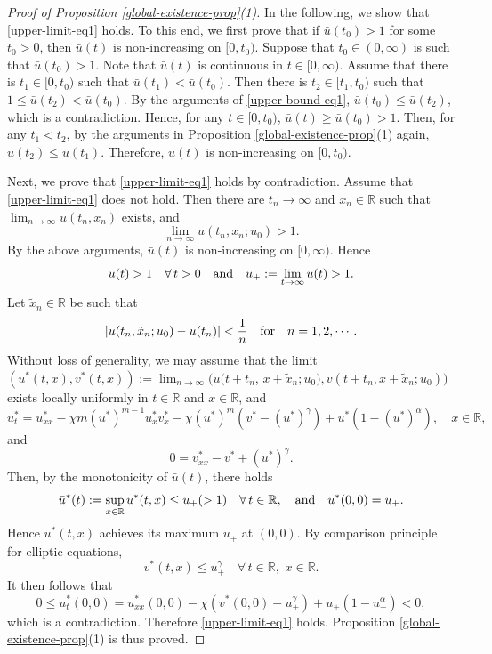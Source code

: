 \documentclass[11pt]{article} %
\theoremstyle{remark}
\theoremstyle{remark}
\numberwithin{equation}{section}
\numberwithin{figure}{section}
\numberwithin{table}{section}
\newcommand\RR{\ensuremath{\mathbb{R}}}
\begin{document}
\begin{proof} [Proof of Proposition \ref{global-existence-prop}(1)]
In the following, we show that \eqref{upper-limit-eq1} holds. 
To this end,  we first  prove that if $\bar u(t_0)>1$ for some $t_0>0$, then
$\bar u(t)$  is  non-increasing on $[0,t_0)$. 
Suppose that $t_0\in (0,\infty)$ is such that $\bar u(t_0)>1$.  Note that $\bar u(t)$ is continuous in $t\in [0,\infty)$.
Assume that there is $t_1\in [0,t_0)$ such that  $\bar u(t_1)<\bar u(t_0)$. Then there is $t_2\in [t_1,t_0)$ such that $1\le \bar u(t_2)<\bar u(t_0)$.  By the arguments of \eqref{upper-bound-eq1}, $\bar u(t_0)\le \bar u(t_2)$, which is a contradiction.
Hence, for any $t\in [0,t_0)$, $\bar u(t)\ge \bar u(t_0)>1$. Then, for any $t_1<t_2$,   by the arguments in Proposition 
\ref{global-existence-prop}(1) again, 
$\bar u(t_2)\le \bar u(t_1)$. Therefore,  $\bar u(t)$ is non-increasing on $[0,t_0)$.

Next, we prove that
\eqref{upper-limit-eq1} holds by contradiction. 
Assume that \eqref{upper-limit-eq1} does not hold. 
Then there are $t_n\to \infty$ and $x_n\in\RR$ such that $\lim_{n\to\infty} u(t_n,x_n)$ exists, and 
$$
\lim_{n\to\infty}u(t_n,x_n;u_0)>1.
$$
 By the above arguments,  $\bar u(t)$ is non-increasing on $[0,\infty)$. Hence
$$
\bar u(t)>1\quad \forall\, t>0\quad {\rm and}\quad u_+:=\lim_{t\to\infty}\bar u(t)>1.
$$
Let $\tilde x_n\in\mathbb{R}$ be such that 
$$
|u(t_n,\tilde x_n;u_0)-\bar u(t_n)|<\frac{1}{n}\quad {\rm for}\quad n=1,2,\cdots.
$$
Without loss of generality, we may assume that
the limit $(u^*(t,x),v^*(t,x)):=\lim_{n\to\infty} (u(t+t_n$, $x+\tilde x_n;u_0), v(t+t_n,x+\tilde x_n;u_0))$ exists locally uniformly in $t\in\mathbb{R}$ and $x\in\mathbb{R}$,  and
$$
u^*_t=u^*_{xx}-\chi m (u^*)^{m-1} u^*_x v^*_x -\chi (u^*)^m (v^*-(u^*)^\gamma)+u^*(1-(u^*)^\alpha),\quad x\in\mathbb{R},
$$
and
$$
0=v^*_{xx}-v^*+(u^*)^\gamma.
$$
Then, by the monotonicity of $\bar u(t)$, there holds
$$
\bar u^*(t):=\sup_{x\in\mathbb{R}}u^*(t,x) \le u_+(>1) \quad \forall\, t\in\mathbb{R},
\quad {\rm and}\quad 
u^*(0,0)=u_+.
$$
Hence $u^*(t,x)$ achieves its maximum $u_+$ at $(0,0)$.
By comparison principle for elliptic equations,
$$
v^*(t,x)\le u_+^\gamma \quad \forall\, t\in\mathbb{R},\,\, x\in\mathbb{R}.
$$
It then follows that
$$
0\le   u^*_t(0,0)=u^*_{xx}(0,0)-\chi (v^*(0,0)-u_+^\gamma)+u_+(1-u_+^\alpha)<0,
$$
which is a contradiction.  Therefore    \eqref{upper-limit-eq1} holds.  Proposition \ref{global-existence-prop}(1) is thus proved.
\end{proof}
\end{document}
